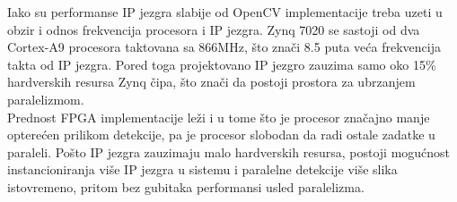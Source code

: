 Iako su performanse IP jezgra slabije od OpenCV implementacije treba uzeti u
obzir i odnos frekvencija procesora i IP jezgra.
Zynq 7020 se sastoji od dva Cortex-A9 procesora taktovana sa 866MHz, što znači 8.5
puta veća frekvencija takta od IP jezgra.
Pored toga projektovano IP jezgro zauzima samo oko 15\% hardverskih resursa Zynq
čipa, što znači da postoji prostora za ubrzanjem paralelizmom. \\

Prednost FPGA implementacije leži i u tome što je procesor značajno
manje opterećen prilikom detekcije, pa je procesor slobodan da radi ostale
zadatke u paraleli.
Pošto IP jezgra zauzimaju malo hardverskih resursa, postoji mogućnost
instancioniranja više IP jezgra u sistemu i paralelne detekcije više slika
istovremeno, pritom bez gubitaka performansi usled paralelizma. \\